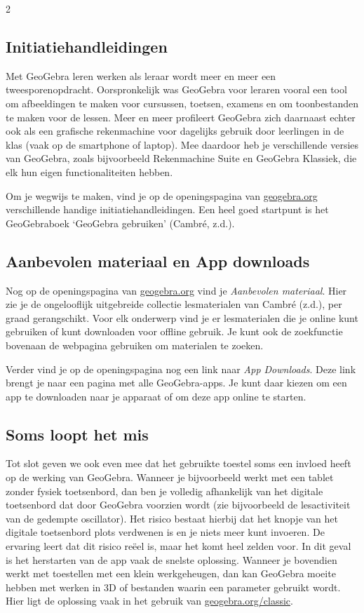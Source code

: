 \begin{multicols}{2}
\subsection*{Initiatiehandleidingen}
Met GeoGebra leren werken als leraar wordt meer en meer een tweesporenopdracht.
Oorspronkelijk was GeoGebra voor leraren vooral een tool om afbeeldingen te maken voor cursussen, toetsen, examens en om toonbestanden te maken voor de lessen.
Meer en meer profileert GeoGebra zich daarnaast echter ook als een grafische rekenmachine voor dagelijks gebruik door leerlingen in de klas (vaak op de smartphone of laptop). Mee daardoor heb je verschillende versies van GeoGebra, zoals bijvoorbeeld Rekenmachine Suite en GeoGebra Klassiek, die elk hun eigen functionaliteiten hebben.

Om je wegwijs te maken, vind je op de openingspagina van \url{geogebra.org} verschillende handige initiatiehandleidingen. Een heel goed startpunt is het GeoGebraboek `GeoGebra gebruiken' (Cambré, z.d.).


\subsection*{Aanbevolen materiaal en App downloads}
Nog op de openingspagina van \url{geogebra.org} vind je \emph{Aanbevolen materiaal}. Hier zie je de ongelooflijk uitgebreide collectie lesmaterialen van Cambré (z.d.), per graad gerangschikt. Voor elk onderwerp vind je er lesmaterialen die je online kunt gebruiken of kunt downloaden voor offline gebruik. Je kunt ook de zoekfunctie bovenaan de webpagina gebruiken om materialen te zoeken.

Verder vind je op de openingspagina nog een link naar \emph{App Downloads}. Deze link brengt je naar een pagina met alle GeoGebra-apps. Je kunt daar kiezen om een app te downloaden naar je apparaat of om deze app online te starten.




\subsection*{Soms loopt het mis}
Tot slot geven we ook even mee dat het gebruikte toestel soms een invloed heeft op de werking van GeoGebra. Wanneer je bijvoorbeeld werkt met een tablet zonder fysiek toetsenbord, dan ben je volledig afhankelijk van het digitale toetsenbord dat door GeoGebra voorzien wordt (zie bijvoorbeeld de lesactiviteit van de gedempte oscillator). Het risico bestaat hierbij dat het knopje van het digitale toetsenbord plots verdwenen is en je niets meer kunt invoeren. De ervaring leert dat dit risico re\"eel is, maar het komt heel zelden voor. In dit geval is het herstarten van de app vaak de snelste oplossing. Wanneer je bovendien werkt met toestellen met een klein werkgeheugen, dan kan GeoGebra moeite hebben met werken in 3D of bestanden waarin een parameter gebruikt wordt. Hier ligt de oplossing vaak in het gebruik van \url{geogebra.org/classic}.

 


 \end{multicols}

